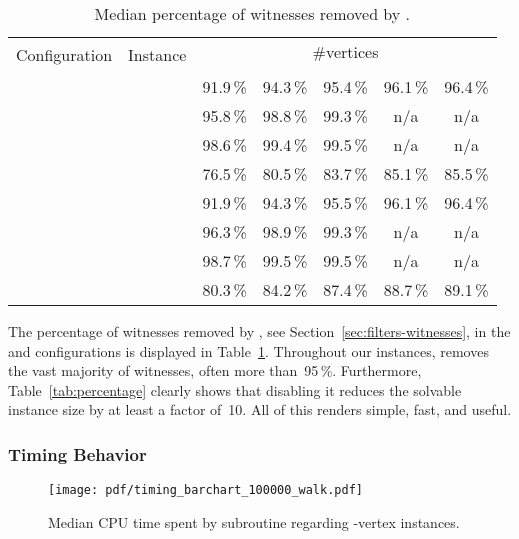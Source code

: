 \begin{table}
	\centering
	\small
	\begin{tabular}{|l|l|ccccc|}
		\hline
		\multirow{2}{*}{Configuration} & \multirow{2}{*}{Instance} & \multicolumn{5}{|c|}{\#vertices} \\
		& &  &  &  &  &  \\
		\hline
		\hline
		\multirow{4}{*}{\vdefault}
			& \walk           & 91.9\,\% & 94.3\,\% & 95.4\,\% & 96.1\,\% & 96.4\,\% \\
			& \sinewalk       & 95.8\,\% & 98.8\,\% & 99.3\,\% &      n/a &      n/a \\
			& \parabolawalk   & 98.6\,\% & 99.4\,\% & 99.5\,\% &      n/a &      n/a \\
			& \concavevalleys & 76.5\,\% & 80.5\,\% & 83.7\,\% & 85.1\,\% & 85.5\,\% \\
		\hline
		\hline
		\multirow{4}{*}{\pdefault}
			& \walk           & 91.9\,\% & 94.3\,\% & 95.5\,\% & 96.1\,\% & 96.4\,\% \\
			& \sinewalk       & 96.3\,\% & 98.9\,\% & 99.3\,\% &      n/a &      n/a \\
			& \parabolawalk   & 98.7\,\% & 99.5\,\% & 99.5\,\% &      n/a &      n/a \\
			& \concavevalleys & 80.3\,\% & 84.2\,\% & 87.4\,\% & 88.7\,\% & 89.1\,\% \\
		\hline
	\end{tabular}
	\caption{Median percentage of witnesses removed by \witnessfilter.}
	\label{tab:witnessfilter}
\end{table}

The percentage of witnesses removed by \witnessfilter, see Section~\ref{sec:filters-witnesses}, in the \vdefault and \pdefault configurations is displayed in Table~\ref{tab:witnessfilter}.
Throughout our instances, \witnessfilter removes the vast majority of witnesses, often more than~95\,\%.
Furthermore, Table~\ref{tab:percentage} clearly shows that disabling it reduces the solvable instance size by at least a factor of~10.
All of this renders \witnessfilter simple, fast, and useful.

\subsubsection{Timing Behavior}
\label{sec:experiments-time}

\begin{figure}
	\centering
	\texttt{[image: pdf/timing\_barchart\_100000\_walk.pdf]}
	\caption{Median CPU time spent by subroutine regarding -vertex \walk instances.}
	\label{fig:time-bar}
\end{figure}

